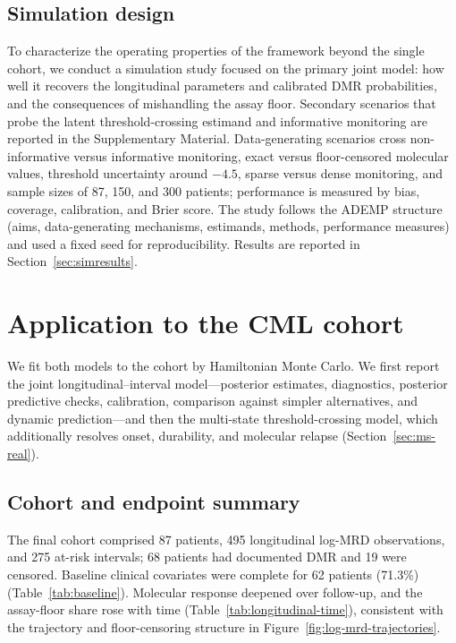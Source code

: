 \documentclass[11pt]{article}
\begin{document}
\subsection{Simulation design}
\label{sec:sim}

To characterize the operating properties of the framework beyond the
single cohort, we conduct a simulation study focused on the primary joint model: how well
it recovers the longitudinal parameters and calibrated DMR probabilities, and
the consequences of mishandling the assay floor. Secondary scenarios that
probe the latent threshold-crossing estimand and informative monitoring are
reported in the Supplementary Material. Data-generating
scenarios cross non-informative versus informative monitoring, exact
versus floor-censored molecular values, threshold uncertainty around
$-4.5$, sparse versus dense monitoring, and sample sizes of 87, 150, and
300 patients; performance is measured by bias, coverage, calibration, and
Brier score. The study follows the ADEMP structure (aims, data-generating
mechanisms, estimands, methods, performance measures) and used a fixed seed
for reproducibility. Results are reported in Section~\ref{sec:simresults}.

\section{Application to the CML cohort}
\label{sec:application}

We fit both models to the cohort by Hamiltonian Monte Carlo. We first report
the joint longitudinal--interval model---posterior estimates, diagnostics,
posterior predictive checks, calibration, comparison against simpler
alternatives, and dynamic prediction---and then the multi-state
threshold-crossing model, which additionally resolves onset, durability, and
molecular relapse (Section~\ref{sec:ms-real}).

\subsection{Cohort and endpoint summary}

The final cohort comprised 87 patients, 495 longitudinal log-MRD
observations, and 275 at-risk intervals; 68 patients had documented DMR
and 19 were censored. Baseline clinical covariates were complete for 62
patients (71.3\%) (Table~\ref{tab:baseline}). Molecular response deepened
over follow-up, and the assay-floor share rose with time
(Table~\ref{tab:longitudinal-time}), consistent with the trajectory and
floor-censoring structure in Figure~\ref{fig:log-mrd-trajectories}.
\end{document}

